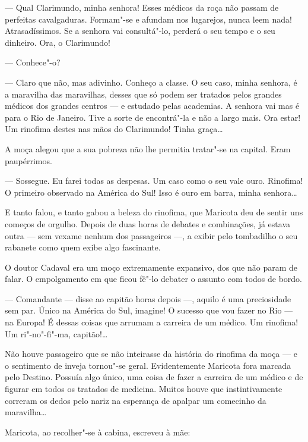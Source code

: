 --- Qual Clarimundo, minha senhora! Esses médicos da roça não passam de
perfeitas cavalgaduras. Formam"-se e afundam nos lugarejos, nunca leem
nada! Atrasadíssimos. Se a senhora vai consultá"-lo, perderá o seu tempo
e o seu dinheiro. Ora, o Clarimundo!

--- Conhece"-o?

--- Claro que não, mas adivinho. Conheço a classe. O seu caso, minha
senhora, é a maravilha das maravilhas, desses que só podem ser tratados
pelos grandes médicos dos grandes centros --- e estudado pelas
academias. A senhora vai mas é para o Rio de Janeiro. Tive a sorte de
encontrá"-la e não a largo mais. Ora estar! Um rinofima destes nas mãos
do Clarimundo! Tinha graça\ldots{}

A moça alegou que a sua pobreza não lhe permitia tratar"-se na capital.
Eram paupérrimos.

--- Sossegue. Eu farei todas as despesas. Um caso como o seu vale ouro.
Rinofima! O primeiro observado na América do Sul! Isso é ouro em barra,
minha senhora\ldots{}

E tanto falou, e tanto gabou a beleza do rinofima, que Maricota deu de
sentir uns começos de orgulho. Depois de duas horas de debates e
combinações, já estava outra --- sem vexame nenhum dos passageiros ---,
a exibir pelo tombadilho o seu rabanete como quem exibe algo fascinante.

O doutor Cadaval era um moço extremamente expansivo, dos que não param
de falar. O empolgamento em que ficou fê"-lo debater o assunto com todos
de bordo.

--- Comandante --- disse ao capitão horas depois ---, aquilo é uma
preciosidade sem par. Único na América do Sul, imagine! O sucesso que
vou fazer no Rio --- na Europa! É dessas coisas que arrumam a carreira
de um médico. Um rinofima! Um ri"-no"-fi"-ma, capitão!\ldots{}

Não houve passageiro que se não inteirasse da história do rinofima da
moça --- e o sentimento de inveja tornou"-se geral. Evidentemente
Maricota fora marcada pelo Destino. Possuía algo único, uma coisa de
fazer a carreira de um médico e de figurar em todos os tratados de
medicina. Muitos houve que instintivamente correram os dedos pelo nariz
na esperança de apalpar um comecinho da maravilha\ldots{}

Maricota, ao recolher"-se à cabina, escreveu à mãe:

